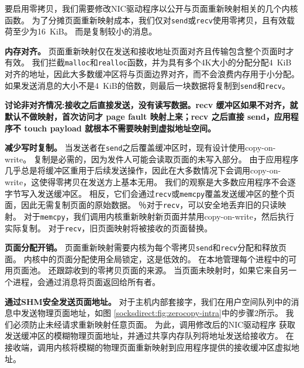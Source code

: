 

要启用零拷贝，我们需要修改NIC驱动程序以公开与页面重新映射相关的几个内核函数。
为了分摊页面重新映射成本，我们仅对\texttt {send}或\texttt {recv}使用零拷贝，且有效载荷至少为16~KiB。
而是复制较小的消息。

\textbf {内存对齐。}
页面重新映射仅在发送和接收地址页面对齐且传输包含整个页面时才有效。
我们拦截\texttt {malloc}和\texttt {realloc}函数，并为具有多个4K大小的分配分配4~KiB对齐的地址，因此大多数缓冲区将与页面边界对齐，而不会浪费内存用于小分配。
如果发送消息的大小不是4~KiB的倍数，则最后一块数据将复制到\texttt {send}和\texttt {recv}。

\textbf{讨论非对齐情况:接收之后直接发送，没有读写数据。recv 缓冲区如果不对齐，就默认不做映射，首次访问才 page fault 映射上来；recv 之后直接 send，应用程序不 touch payload 就根本不需要映射到虚拟地址空间。}



\textbf{减少写时复制。}
当发送者在\texttt {send}之后覆盖缓冲区时，现有设计使用copy-on-write。
复制是必需的，因为发件人可能会读取页面的未写入部分。
由于应用程序几乎总是将缓冲区重用于后续发送操作，因此在大多数情况下会调用copy-on-write，这使得零拷贝在发送方上基本无用。
我们的观察是大多数应用程序不会逐字节写入发送缓冲区。 相反，它们会通过\texttt {recv}或\texttt {memcpy}覆盖发送缓冲区的整个页面，因此无需复制页面的原始数据。
％对于\texttt {recv}，可以安全地丢弃旧的只读映射。
对于\texttt {memcpy}，我们调用内核重新映射新页面并禁用copy-on-write，然后执行实际复制。
对于\texttt {recv}，旧页面映射将被接收的页面替换。


\textbf {页面分配开销。}
页面重新映射需要内核为每个零拷贝\texttt {send}和\texttt {recv}分配和释放页面。
内核中的页面分配使用全局锁定，这是低效的。 \libipc {}在本地管理每个进程中的可用页面池。
\libipc {}还跟踪收到的零拷贝页面的来源。
当页面未映射时，如果它来自另一个进程，\libipc {}会通过消息将页面返回给所有者。

\textbf {通过SHM安全发送页面地址。}
对于主机内部套接字，我们在用户空间队列中的消息中发送物理页面地址，如图 \ref {socksdirect:fig:zerocopy-intra}中的步骤2所示。
我们必须防止未经请求重新映射任意页面。
为此，\libipc {}调用修改后的NIC驱动程序
获取发送缓冲区的模糊物理页面地址，并通过共享内存队列将地址发送给接收方。
在接收端，\libipc {}调用内核将模糊的物理页面重新映射到应用程序提供的接收缓冲区虚拟地址。

